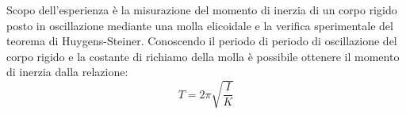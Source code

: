 Scopo dell'esperienza è la misurazione del momento di inerzia di un corpo rigido posto in oscillazione mediante una molla elicoidale e la verifica sperimentale del teorema di Huygens-Steiner. Conoscendo il periodo di periodo di oscillazione del corpo rigido e la costante di richiamo della molla è possibile ottenere il momento di inerzia dalla relazione:
\begin{equation}
	T=2\pi\sqrt{\frac{I}{K}}
\end{equation}
